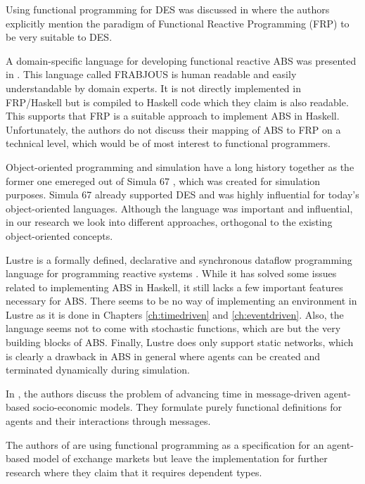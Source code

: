 Using functional programming for DES was discussed in \cite{jankovic_functional_2007} where the authors explicitly mention the paradigm of Functional Reactive Programming (FRP) to be very suitable to DES.

A domain-specific language for developing functional reactive ABS was presented in \cite{schneider_towards_2012,vendrov_frabjous_2014}. This language called FRABJOUS is human readable and easily understandable by domain experts. It is not directly implemented in FRP/Haskell but is compiled to Haskell code which they claim is also readable. This supports that FRP is a suitable approach to implement ABS in Haskell. Unfortunately, the authors do not discuss their mapping of ABS to FRP on a technical level, which would be of most interest to functional programmers.

Object-oriented programming and simulation have a long history together as the former one emereged out of Simula 67 \cite{dahl_birth_2002}, which was created for simulation purposes. Simula 67 already supported DES and was highly influential for today's object-oriented languages. Although the language was important and influential, in our research we look into different approaches, orthogonal to the existing object-oriented concepts.

Lustre is a formally defined, declarative and synchronous dataflow programming language for programming reactive systems \cite{halbwachs_synchronous_1991}. While it has solved some issues related to implementing ABS in Haskell, it still lacks a few important features necessary for ABS. There seems to be no way of implementing an environment in Lustre as it is done in Chapters \ref{ch:timedriven} and \ref{ch:eventdriven}. Also, the language seems not to come with stochastic functions, which are but the very building blocks of ABS. Finally, Lustre does only support static networks, which is clearly a drawback in ABS in general where agents can be created and terminated dynamically during simulation.

In \cite{botta_time_2010}, the authors discuss the problem of advancing time in message-driven agent-based socio-economic models. They formulate purely functional definitions for agents and their interactions through messages.

The authors of \cite{botta_functional_2011} are using functional programming as a specification for an agent-based model of exchange markets but leave the implementation for further research where they claim that it requires dependent types. %

